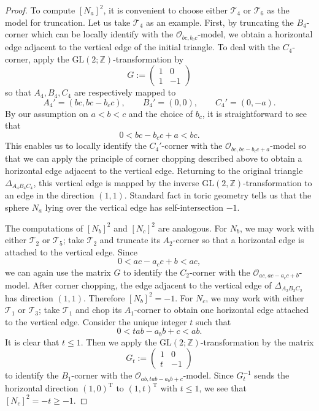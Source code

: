 \documentclass[11pt]{article}
\theoremstyle{definition}
\theoremstyle{remark}
\begin{document}
\begin{proof}
  To compute $[N_a]^2$, it is convenient to choose either $\mathcal{T}_4$ or $\mathcal{T}_6$ as the model for truncation. Let us take $\mathcal{T}_4$ as an example. First, by truncating the $B_4$-corner which can be locally identify with the $\mathcal{O}_{bc,b_cc}$-model, we obtain a horizontal edge adjacent to the vertical edge of the initial triangle. To deal with the $C_4$-corner, apply the $\text{GL}(2;\mathbb{Z})$-transformation by 
  \[G:=\begin{pmatrix}
    1 & 0 \\
    1 & -1
  \end{pmatrix}\]
  so that $A_4,B_4,C_4$ are respectively mapped to 
  \[A_4'=(bc,bc-b_cc),\qquad B_4'=(0,0),\qquad C_4'=(0,-a).\]
  By our assumption on $a<b<c$ and the choice of $b_c$, it is straightforward to see that \[0<bc-b_cc+a<bc.\]
  This enables us to locally identify the $C_4'$-corner with the $\mathcal{O}_{bc,bc-b_cc+a}$-model so that we can apply the principle of corner chopping described above to obtain a horizontal edge adjacent to the vertical edge. Returning to the original triangle $\Delta_{A_4B_4C_4}$, this vertical edge is mapped by the inverse $\text{GL}(2,\mathbb{Z})$-transformation to an edge in the direction $(1,1)$. Standard fact in toric geometry tells us that the sphere $N_a$ lying over the vertical edge has self-intersection $-1$.

  The computations of $[N_b]^2$ and $[N_c]^2$ are analogous. For $N_b$, we may work with either $\mathcal{T}_2$ or $\mathcal{T}_5$; take $\mathcal{T}_2$ and truncate its $A_2$-corner so that a horizontal edge is attached to the vertical edge. Since
  \[0<ac-a_cc+b<ac,\]
  we can again use the matrix $G$ to identify the $C_2$-corner with the $\mathcal{O}_{ac,ac-a_cc+b}$-model. After corner chopping, the edge adjacent to the vertical edge of $\Delta_{A_2B_2C_2}$ has direction $(1,1)$. Therefore $[N_b]^2=-1$. For $N_c$, we may work with either $\mathcal{T}_1$ or $\mathcal{T}_3$; take $\mathcal{T}_1$ and chop its $A_1$-corner to obtain one horizontal edge attached to the vertical edge. Consider the unique integer $t$ such that 
  \[0<tab-a_bb+c<ab.\] It is clear that $t\leq 1$. Then we apply the $\text{GL}(2;\mathbb{Z})$-transformation by the matrix
  \[G_t:=\begin{pmatrix}
    1 & 0 \\
    t & -1
  \end{pmatrix}\]
  to identify the $B_1$-corner with the $\mathcal{O}_{ab,tab-a_bb+c}$-model. Since $G_t^{-1}$ sends the horizontal direction $(1,0)^{\text{T}}$ to $(1,t)^{\text{T}}$ with $t\leq 1$, we see that $[N_c]^2=-t\geq -1$.
\end{proof}
\end{document}
